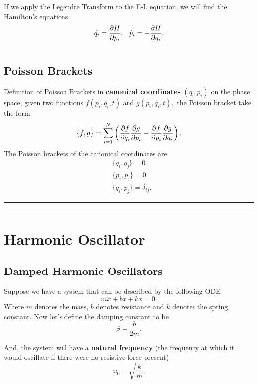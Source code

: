 \documentclass[12pt,english]{article}
\numberwithin{equation}{subsection}
\begin{document}
If we apply the Legendre Transform to the E-L equation, we will find the Hamilton's equations
\begin{align}
    \dot{q}_i = \pdv{H}{p_i}, &  & \dot{p}_i = -\pdv{H}{q_i}.
\end{align}

\par\noindent\rule{\textwidth}{0.4pt}
\subsection{Poisson Brackets}
Definition of Poisson Brackets in \textbf{canonical coordinates} $(q_i, p_i)$ on the phase space, given two functions $f(p_i, q_i, t)$ and $g(p_i, q_i, t),$ the Poisson bracket take the form \cite{noauthor_poissonbracket_2021}
\begin{equation}
    \{f,g\} = \sum_{i = 1}^{N} \left(\pdv{f}{q_i}\pdv{g}{p_i}-\pdv{f}{p_i}\pdv{g}{q_i}\right).
\end{equation}
The Poisson brackets of the canonical coordinates are
\begin{align*}
     & \{q_i,q_j\}=0            \\
     & \{p_i,p_j\}=0            \\
     & \{q_i,p_j\}=\delta_{ij}.
\end{align*}

\par\noindent\rule{\textwidth}{0.4pt}
\par\noindent\rule{\textwidth}{0.4pt}
\section{Harmonic Oscillator}
\subsection{Damped Harmonic Oscillators}
Suppose we have a system that can be described by the following ODE
\begin{equation}
    m\ddot{x} + b \dot{x} + kx = 0.
\end{equation}
Where $m$ denotes the mass, $b$ denotes resistance and $k$ denotes the spring constant. Now let's define the damping constant to be
\begin{equation*}
    \beta = \frac{b}{2m}.
\end{equation*}

And, the system will have a \textbf{natural frequency} (the frequency at which it would oscillate if there were no resistive force present)
\begin{equation*}
    \omega_0 = \sqrt{\frac{k}{m}}.
\end{equation*}
\end{document}
